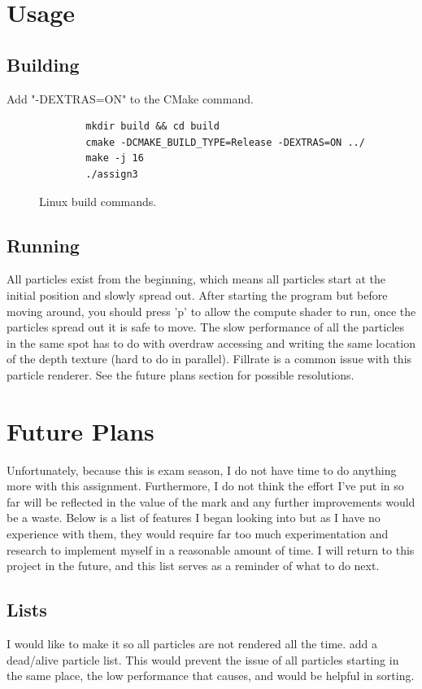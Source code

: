 \documentclass[]{report}
\begin{document}
\section{Usage}
\subsection{Building}
Add "-DEXTRAS=ON" to the CMake command.
\begin{figure}[H]
	\centering
	\begin{verbatim}
		mkdir build && cd build
		cmake -DCMAKE_BUILD_TYPE=Release -DEXTRAS=ON ../
		make -j 16
		./assign3
	\end{verbatim}
	\caption{Linux build commands.}
\end{figure}
\subsection{Running}
All particles exist from the beginning, which means all particles start at the initial position and slowly spread out. After starting the program but before moving around, you should press 'p' to allow the compute shader to run, once the particles spread out it is safe to move. The slow performance of all the particles in the same spot has to do with overdraw accessing and writing the same location of the depth texture (hard to do in parallel). Fillrate is a common issue with this particle renderer. See the future plans section for possible resolutions.

\section{Future Plans}\label{sec:fp}
Unfortunately, because this is exam season, I do not have time to do anything more with this assignment. Furthermore, I do not think the effort I've put in so far will be reflected in the value of the mark and any further improvements would be a waste. Below is a list of features I began looking into but as I have no experience with them, they would require far too much experimentation and research to implement myself in a reasonable amount of time. I will return to this project in the future, and this list serves as a reminder of what to do next.
\subsection{Lists}
I would like to make it so all particles are not rendered all the time. add a dead/alive particle list. This would prevent the issue of all particles starting in the same place, the low performance that causes, and would be helpful in sorting.
\end{document}
